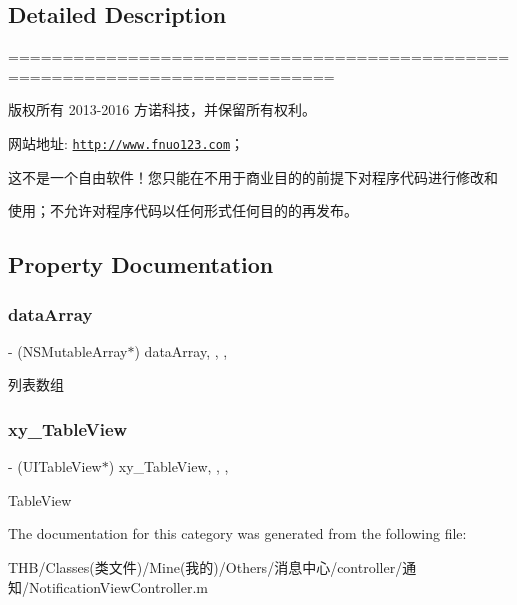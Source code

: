 \subsection{Detailed Description}
============================================================================

版权所有 2013-\/2016 方诺科技，并保留所有权利。

网站地址\+: \href{http://www.fnuo123.com}{\tt http\+://www.\+fnuo123.\+com}； 



这不是一个自由软件！您只能在不用于商业目的的前提下对程序代码进行修改和

使用；不允许对程序代码以任何形式任何目的的再发布。 

 

\subsection{Property Documentation}
\mbox{\label{category_notification_view_controller_07_08_afdfbeb1a7d138d332ada33b09cdde5bf}} 
\subsubsection{\texorpdfstring{data\+Array}{dataArray}}
{\footnotesize\ttfamily -\/ (N\+S\+Mutable\+Array$\ast$) data\+Array\hspace{0.3cm}{\ttfamily [read]}, {\ttfamily [write]}, {\ttfamily [nonatomic]}, {\ttfamily [strong]}}

列表数组 \mbox{\label{category_notification_view_controller_07_08_a89d7f33de104f0dbd5339e5f4015aa6f}} 
\subsubsection{\texorpdfstring{xy\+\_\+\+Table\+View}{xy\_TableView}}
{\footnotesize\ttfamily -\/ (U\+I\+Table\+View$\ast$) xy\+\_\+\+Table\+View\hspace{0.3cm}{\ttfamily [read]}, {\ttfamily [write]}, {\ttfamily [nonatomic]}, {\ttfamily [strong]}}

Table\+View 

The documentation for this category was generated from the following file\+:\begin{DoxyCompactItemize}
\item 
T\+H\+B/\+Classes(类文件)/\+Mine(我的)/\+Others/消息中心/controller/通知/Notification\+View\+Controller.\+m\end{DoxyCompactItemize}

